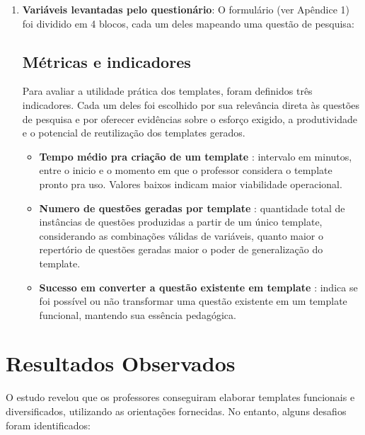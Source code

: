 \begin{enumerate}
    \item \textbf{Variáveis levantadas pelo questionário}:  O formulário (ver Apêndice 1) foi dividido em 4 blocos, cada um deles mapeando uma questão de pesquisa: 



\subsection{Métricas e indicadores}

Para avaliar a utilidade prática dos templates, foram definidos três indicadores. Cada um deles foi escolhido por sua relevância direta às questões de pesquisa e por oferecer evidências sobre o esforço exigido, a produtividade e o potencial de reutilização dos templates gerados.
    \begin{itemize}
        \item \textbf{Tempo médio pra criação de um template} : intervalo em minutos, entre o inicio e o momento em que o professor considera o template pronto pra uso. Valores baixos indicam maior viabilidade operacional.
        \item \textbf{Numero de questões geradas por template} : quantidade total de instâncias de questões produzidas a partir de um único template, considerando as combinações válidas de variáveis, quanto maior o repertório de questões geradas maior o poder de generalização do template.
        \item  \textbf{Sucesso em converter a questão existente em template }: indica se foi possível ou não transformar uma questão existente em um template funcional, mantendo sua essência pedagógica. 
    \end{itemize}

    
\end{enumerate}



\section{Resultados Observados}

O estudo revelou que os professores conseguiram elaborar templates funcionais e diversificados, utilizando as orientações fornecidas. No entanto, alguns desafios foram identificados:

